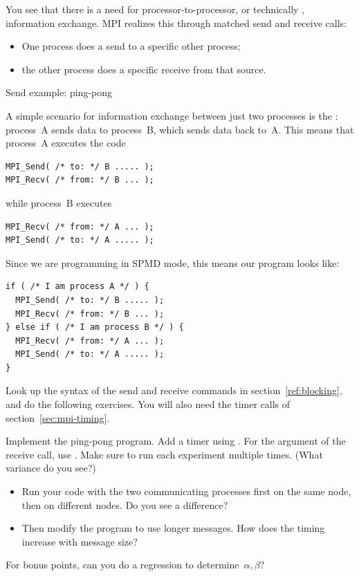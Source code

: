 You see that there is a need for processor-to-processor, or
technically , information exchange.
MPI realizes this through matched send and receive calls:
\begin{itemize}
\item One process does a send to a specific other process;
\item the other process does a specific receive from that source.
\end{itemize}

 {Send example: ping-pong}

A simple scenario for information exchange between just two processes
is the : process~A sends data to process~B, which
sends data back to~A. This means that process~A executes the code
\begin{verbatim}
MPI_Send( /* to: */ B ..... );
MPI_Recv( /* from: */ B ... );
\end{verbatim}
while process~B executes
\begin{verbatim}
MPI_Recv( /* from: */ A ... );
MPI_Send( /* to: */ A ..... );
\end{verbatim}
Since we are programming in SPMD mode, this means our program looks like:
\begin{verbatim}
if ( /* I am process A */ ) {
  MPI_Send( /* to: */ B ..... );
  MPI_Recv( /* from: */ B ... );
} else if ( /* I am process B */ ) {
  MPI_Recv( /* from: */ A ... );
  MPI_Send( /* to: */ A ..... );
}
\end{verbatim}

Look up the syntax of the send and receive commands in section~\ref{ref:blocking},
and do the following exercises. 
You will also need the timer calls of section~\ref{sec:mpi-timing}.

\begin{exercise}
  \label{ex:pingpong}
  Implement the ping-pong program. Add a timer using .
  For the  argument of the receive call, use
  .
  Make sure to run each experiment multiple times. (What variance do
  you see?)

  \begin{itemize}
  \item Run your code with the two communicating processes first on
    the same node, then on different nodes. Do you see a difference?
  \item Then modify the program
    to use longer messages. How does the timing increase with message size?
  \end{itemize}
  For bonus points, can you do a regression to determine~$\alpha,\beta$?
\end{exercise}

